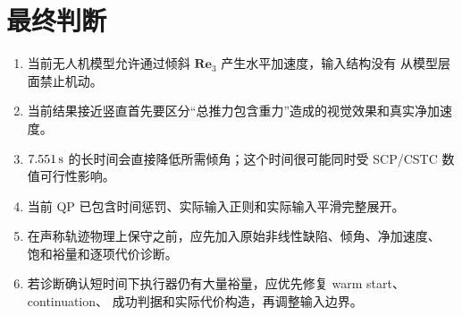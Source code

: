 \documentclass[UTF8,a4paper,11pt]{ctexart}
\begin{document}
\section{最终判断}

\begin{enumerate}
  \item 当前无人机模型允许通过倾斜 $\bm R\bm e_3$ 产生水平加速度，输入结构没有
  从模型层面禁止机动。
  \item 当前结果接近竖直首先要区分“总推力包含重力”造成的视觉效果和真实净加速度。
  \item $7.551\,{\rm s}$ 的长时间会直接降低所需倾角；这个时间很可能同时受
  SCP/CSTC 数值可行性影响。
  \item 当前 QP 已包含时间惩罚、实际输入正则和实际输入平滑完整展开。
  \item 在声称轨迹物理上保守之前，应先加入原始非线性缺陷、倾角、净加速度、
  饱和裕量和逐项代价诊断。
  \item 若诊断确认短时间下执行器仍有大量裕量，应优先修复 warm start、continuation、
  成功判据和实际代价构造，再调整输入边界。
\end{enumerate}
\end{document}
